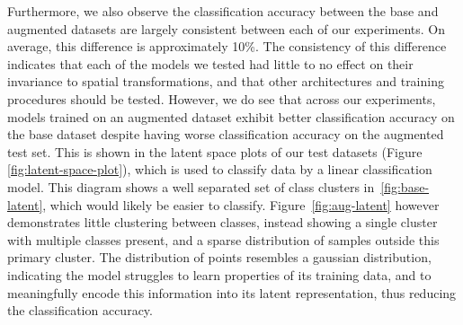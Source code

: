 \documentclass[twocolumn]{article}
\begin{document}
Furthermore, we also observe the classification accuracy between the base and augmented datasets are largely consistent between each of our experiments. On average, this difference is approximately 10\%. The consistency of this difference indicates that each of the models we tested had little to no effect on their invariance to spatial transformations, and that other architectures and training procedures should be tested. However, we do see that across our experiments, models trained on an augmented dataset exhibit better classification accuracy on the base dataset despite having worse classification accuracy on the augmented test set. This is shown in the latent space plots of our test datasets (Figure \ref{fig:latent-space-plot}), which is used to classify data by a linear classification model. This diagram shows a well separated set of class clusters in~\ref{fig:base-latent}, which would likely be easier to classify. Figure~\ref{fig:aug-latent} however demonstrates little clustering between classes, instead showing a single cluster with multiple classes present, and a sparse distribution of samples outside this primary cluster. The distribution of points resembles a gaussian distribution, indicating the model struggles to learn properties of its training data, and to meaningfully encode this information into its latent representation, thus reducing the classification accuracy. 
\end{document}
